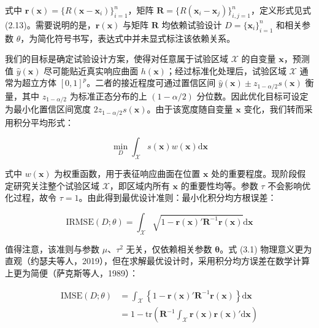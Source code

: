 \documentclass{ctexart}
\begin{document}
式中 $\boldsymbol{r}(\boldsymbol{x})=\{R(\boldsymbol{x}-\boldsymbol{x}_i)\}_{i=1}^n$，矩阵 $\boldsymbol{R}=\{R(\boldsymbol{x}_i-\boldsymbol{x}_j)\}_{i,j=1}^n$，定义形式见式 (2.13)。需要说明的是，$\boldsymbol{r}(\boldsymbol{x})$ 与矩阵 $\boldsymbol{R}$ 均依赖试验设计 $D=\{\boldsymbol{x}_i\}_{i=1}^n$ 和相关参数 $\theta$，为简化符号书写，表达式中并未显式标注该依赖关系。

我们的目标是确定试验设计方案，使得对任意属于试验区域 $\mathcal{X}$ 的自变量 $\boldsymbol{x}$，预测值 $\widehat{y}(\boldsymbol{x})$ 尽可能贴近真实响应曲面 $h(\boldsymbol{x})$；经过标准化处理后，试验区域 $\mathcal{X}$ 通常为超立方体 $[0,1]^p$。二者的接近程度可通过置信区间 $\widehat{y}(\boldsymbol{x})\pm z_{1-\alpha/2}s(\boldsymbol{x})$ 衡量，其中 $z_{1-\alpha/2}$ 为标准正态分布的上 $(1-\alpha/2)$ 分位数。因此优化目标可设定为最小化置信区间宽度 $2z_{1-\alpha/2}s(\boldsymbol{x})$。由于该宽度随自变量 $\boldsymbol{x}$ 变化，我们转而采用积分平均形式：

\begin{equation*}
\min_{D}\int_{\mathcal{X}}s(\boldsymbol{x})w(\boldsymbol{x})\mathrm{d}\boldsymbol{x}
\end{equation*}

式中 $w(\boldsymbol{x})$ 为权重函数，用于表征响应曲面在位置 $\boldsymbol{x}$ 处的重要程度。现阶段假定研究关注整个试验区域 $\mathcal{X}$，即区域内所有 $\boldsymbol{x}$ 的重要性均等。参数 $\tau$ 不会影响优化过程，故令 $\tau=1$。由此得到最优设计准则：最小化积分均方根误差：

\begin{equation*}
\mathrm{IRMSE}(D;\theta)=\int_{\mathcal{X}}\sqrt{1-\boldsymbol{r}(\boldsymbol{x})'\boldsymbol{R}^{-1}\boldsymbol{r}(\boldsymbol{x})}\mathrm{d}\boldsymbol{x}
\tag{3.1}
\end{equation*}

值得注意，该准则与参数 $\mu$、$\tau^2$ 无关，仅依赖相关参数 $\boldsymbol{\theta}$。式 (3.1) 物理意义更为直观（约瑟夫等人，2019），但在求解最优设计时，采用积分均方误差在数学计算上更为简便（萨克斯等人，1989）：

\begin{align*}
\mathrm{IMSE}(D;\theta)&=\int_{\mathcal{X}}\left\{1-\boldsymbol{r}(\boldsymbol{x})'\boldsymbol{R}^{-1}\boldsymbol{r}(\boldsymbol{x})\right\}\mathrm{d}\boldsymbol{x}\tag{3.2}\\
&=1-\mathrm{tr}\left(\boldsymbol{R}^{-1}\int_{\mathcal{X}}\boldsymbol{r}(\boldsymbol{x})\boldsymbol{r}(\boldsymbol{x})'\mathrm{d}\boldsymbol{x}\right)
\end{align*}
\end{document}
